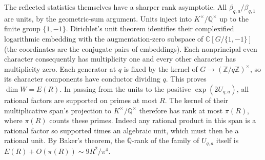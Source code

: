\documentclass[11pt,a4paper,oneside,openany]{report}
\theoremstyle{remark}\newtheorem{remark}[theorem]{Remark}
\numberwithin{equation}{section}
\begin{document}
The reflected statistics themselves have a sharper rank asymptotic.
All $\beta_{q,a}/\beta_{q,1}$ are units, by the geometric-sum argument.
Units inject into $K^\times/\mathbb Q^\times$ up to the finite group
$\{1,-1\}$. Dirichlet's unit theorem identifies their complexified
logarithmic embedding with the augmentation-zero subspace of
$\mathbb C[G/\{1,-1\}]$ (the coordinates are the conjugate pairs of
embeddings). Each nonprincipal even character consequently has multiplicity
one and every other character has multiplicity zero. Each generator at
$q$ is fixed by the kernel of $G\to(\mathbb Z/q\mathbb Z)^\times$, so its
character components have conductor dividing $q$. This proves
$\dim W=E(R)$. In passing from the units to the positive $\exp(2U_{q,a})$,
all rational factors are supported on primes at most $R$. The kernel
of their multiplicative span's projection to $K^\times/\mathbb Q^\times$
therefore has rank at most $\pi(R)$, where $\pi(R)$ counts these primes.
Indeed any rational product in this span is a rational factor so supported
times an algebraic unit, which must then be a rational unit. By Baker's
theorem, the $\overline{\mathbb Q}$-rank of the family of $U_{q,a}$ itself
is $E(R)+O(\pi(R))\sim9R^2/\pi^4$.
\end{document}
